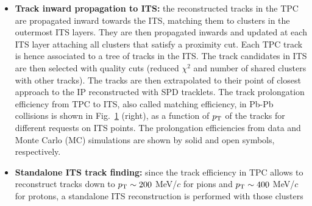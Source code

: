 \begin{itemize}
larger than a certain limit (between 20\% and 50\%). Only tracks that have at least 20 clusters (out of the maximum 159)
and that miss no more than 50\% of the clusters expected for a given track position are accepted. 
The contamination from tracks with more than 10\% wrongly associated clusters does not exceed 3\%
even in most central Pb-Pb collisions.
The efficiency of tracking in TPC is defined as the ratio between the reconstructed tracks 
and the generated primary particles in the simulation, and is shown in Fig.~\ref{fig:TPCtrackEffAndME} (left) as a function of 
the transverse momentum of the track. The tracking efficiency steeply drops below $\pt \sim 0.5 \, \Gevc$
due to the interaction of the particles with the detector material. The efficiency is almost 
independent of the occupancy in the detector. 
\begin{figure}[!h]
\centering
\texttt{[image: FigCap3/TPCtrackEff.png]}
\texttt{[image: FigCap3/ITSTPCmatchEff.png]}
\caption{Left: TPC track finding efficiency for primary particles in pp collisions at $\s=8$ TeV and Pb-Pb collisions at $\sNN=2.76$ TeV(simulation)~\cite{Abelev:2014ffa}. Right: track prolongation efficiency from TPC to ITS as a function of $\pt$ for data and Monte Carlo in Pb-Pb collisions at $\sNN=2.76$ TeV~\cite{Abelev:2014ffa}.}
\label{fig:TPCtrackEffAndME}
\end{figure}
\item{\bf Track inward propagation to ITS:} the reconstructed tracks in the TPC are propagated inward towards the ITS,
matching them to clusters in the outermost ITS layers. They are then propagated inwards and updated at each ITS layer attaching 
all clusters that satisfy a proximity cut. Each TPC track is hence associated to a tree of tracks in the ITS.
The track candidates in ITS are then selected with quality cuts (reduced $\chi^2$ and number of shared clusters with
other tracks). The tracks are then extrapolated to their point of closest approach to the IP reconstructed with SPD 
tracklets. The track prolongation efficiency from TPC to ITS, also called matching efficiency, in Pb-Pb collisions is shown in Fig.~\ref{fig:TPCtrackEffAndME} (right),
as a function of $\pt$ of the tracks for different requests on ITS points. 
The prolongation efficiencies from data and Monte Carlo (MC) simulations are shown by solid and open symbols, respectively. 
\item{\bf Standalone ITS track finding:} since the track efficiency in TPC allows to reconstruct tracks down to $p_{\rm T} \sim 200$ MeV/$c$ for pions 
and $p_{\rm T} \sim 400$ MeV/$c$ for protons, a standalone ITS reconstruction is performed with those clusters 

\end{itemize}
